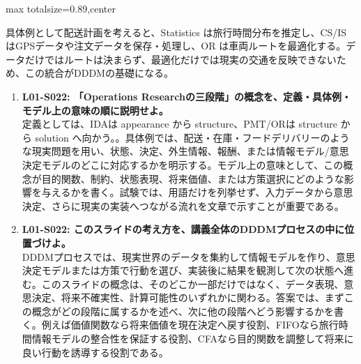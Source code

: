 \begin{minipage}[t]{0.58\textwidth}
\begin{adjustbox}{max totalsize={\textwidth}{0.89\textheight},center}
\begin{minipage}{\textwidth}
具体例として配送計画を考えると、Statistics は旅行時間分布を推定し、CS/IS はGPSデータや注文データを保存・処理し、OR は車両ルートを最適化する。データだけではルートは決まらず、最適化だけでは現実の交通を反映できないため、この統合がDDDMの基礎になる。\par{}\begin{enumerate}\item \textbf{L01-S022: 「Operations Researchの三段階」の概念を、定義・具体例・モデル上の意味の順に説明せよ。}\\定義としては、IDAは appearance から structure、PMT/ORは structure から solution へ向かう。。具体例では、配送・在庫・フードデリバリーのような現実問題を用い、状態、決定、外生情報、報酬、または情報モデル/意思決定モデルのどこに対応するかを明示する。モデル上の意味として、この概念が目的関数、制約、状態表現、将来価値、または方策選択にどのような影響を与えるかを書く。試験では、用語だけを列挙せず、入力データから意思決定、さらに現実の実装へつながる流れを文章で示すことが重要である。\item \textbf{L01-S022: このスライドの考え方を、講義全体のDDDMプロセスの中に位置づけよ。}\\DDDMプロセスでは、現実世界のデータを集約して情報モデルを作り、意思決定モデルまたは方策で行動を選び、実装後に結果を観測して次の状態へ進む。このスライドの概念は、そのどこか一部だけではなく、データ表現、意思決定、将来不確実性、計算可能性のいずれかに関わる。答案では、まずこの概念がどの段階に属するかを述べ、次に他の段階へどう影響するかを書く。例えば価値関数なら将来価値を現在決定へ戻す役割、FIFOなら旅行時間情報モデルの整合性を保証する役割、CFAなら目的関数を調整して将来に良い行動を誘導する役割である。\end{enumerate}
\end{minipage}
\end{adjustbox}
\end{minipage}


